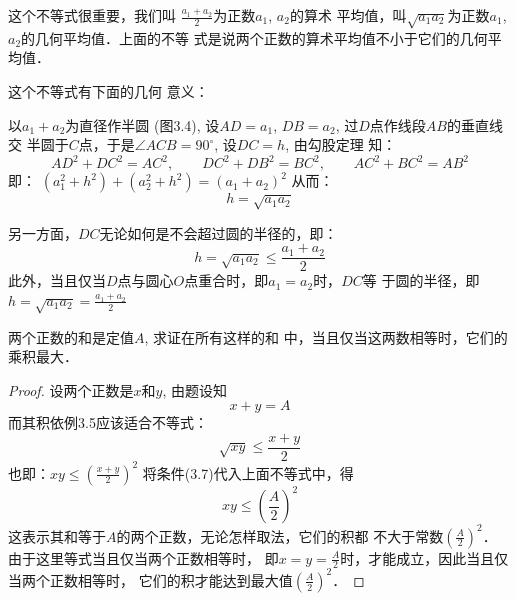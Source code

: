 这个不等式很重要，我们叫
$\frac{a_1+a_2}{2}$为正数$a_1$, $a_2$的算术
平均值，叫$\sqrt{a_1a_2}$为正数$a_1$, $a_2$的几何平均值．上面的不等
式是说两个正数的算术平均值不小于它们的几何平均值．

这个不等式有下面的几何
意义：

\begin{figure}[htp]
    \centering
{} 
    \caption{}
\end{figure}


以$a_1+a_2$为直径作半圆
(图3.4), 设$AD=a_1$, $DB=a_2$,
过$D$点作线段$AB$的垂直线交
半圆于$C$点，于是$\angle ACB=
90^{\circ}$, 设$DC=h$, 由勾股定理
知：
\[AD^2+DC^2=AC^2,\qquad DC^2+DB^2=BC^2,\qquad AC^2+BC^2=AB^2\]
即：
$(a_1^2+h^2)+(a_2^2+h^2) =(a_1+a_2)^2$
从而：
\[h=\sqrt{a_1a_2}\]

另一方面，$DC$无论如何是不会超过圆的半径的，即：
\[h=\sqrt{a_1a_2}\le \frac{a_1+a_2}{2}\]
此外，当且仅当$D$点与圆心$O$点重合时，即$a_1=a_2$时，$DC$等
于圆的半径，即$h=\sqrt{a_1a_2}=\frac{a_1+a_2}{2}$    

\begin{example}
    两个正数的和是定值$A$, 求证在所有这样的和
中，当且仅当这两数相等时，它们的乘积最大．
\end{example}

\begin{proof}
设两个正数是$x$和$y$, 由题设知
\begin{equation}
   x+y=A 
\end{equation}
而其积依例3.5应该适合不等式：
\[\sqrt{xy}\le \frac{x+y}{2}\]
也即：$xy\le \left(\frac{x+y}{2}\right)^2$
将条件(3.7)代入上面不等式中，得
\[xy\le \left(\frac{A}{2}\right)^2\]
这表示其和等于$A$的两个正数，无论怎样取法，它们的积都
不大于常数$\left(\frac{A}{2}\right)^2$．
由于这里等式当且仅当两个正数相等时，
即$x=y=\frac{A}{2}$时，才能成立，因此当且仅当两个正数相等时，
它们的积才能达到最大值$\left(\frac{A}{2}\right)^2$．

\end{proof}
    
